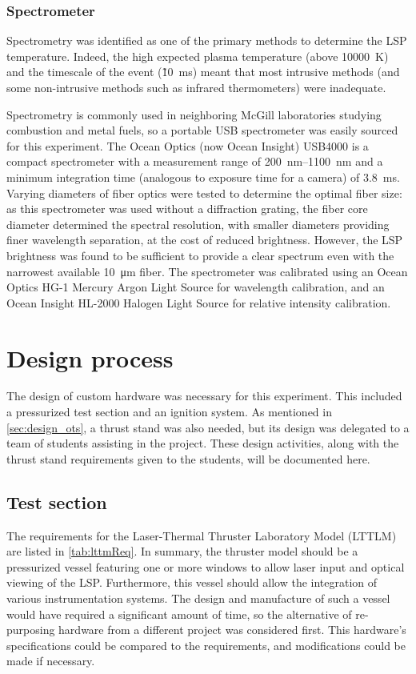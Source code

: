             \subsubsection*{Spectrometer}
                Spectrometry was identified as one of the primary methods to determine the LSP temperature. Indeed, the high expected plasma temperature (above \qty{10000}{K}) and the timescale of the event (\~10~ms) meant that most intrusive methods (and some non-intrusive methods such as infrared thermometers) were inadequate.

                Spectrometry is commonly used in neighboring McGill laboratories studying combustion and metal fuels, so a portable USB spectrometer was easily sourced for this experiment. The Ocean Optics (now Ocean Insight) USB4000 \cite{oceanopticsUSB4000FiberOptic2008} is a compact spectrometer with a measurement range of \qtyrange{200}{1100}{nm} and a minimum integration time (analogous to exposure time for a camera) of 3.8~ms. Varying diameters of fiber optics were tested to determine the optimal fiber size: as this spectrometer was used without a diffraction grating, the fiber core diameter determined the spectral resolution, with smaller diameters providing finer wavelength separation, at the cost of reduced brightness. However, the LSP brightness was found to be sufficient to provide a clear spectrum even with the narrowest available \qty{10}{\um} fiber. The spectrometer was calibrated using an Ocean Optics HG-1 Mercury Argon Light Source for wavelength calibration, and an Ocean Insight HL-2000 Halogen Light Source for relative intensity calibration.

    \section{Design process}
        The design of custom hardware was necessary for this experiment. This included a pressurized test section and an ignition system. As mentioned in \autoref{sec:design_ots}, a thrust stand was also needed, but its design was delegated to a team of students assisting in the project. These design activities, along with the thrust stand requirements given to the students, will be documented here.

        \subsection{Test section} \label{sec:design_testSection}
            The requirements for the Laser-Thermal Thruster Laboratory Model (LTTLM) are listed in \autoref{tab:lttmReq}. In summary, the thruster model should be a pressurized vessel featuring one or more windows to allow laser input and optical viewing of the LSP. Furthermore, this vessel should allow the integration of various instrumentation systems. The design and manufacture of such a vessel would have required a significant amount of time, so the alternative of re-purposing hardware from a different project was considered first. This hardware's specifications could be compared to the requirements, and modifications could be made if necessary.

